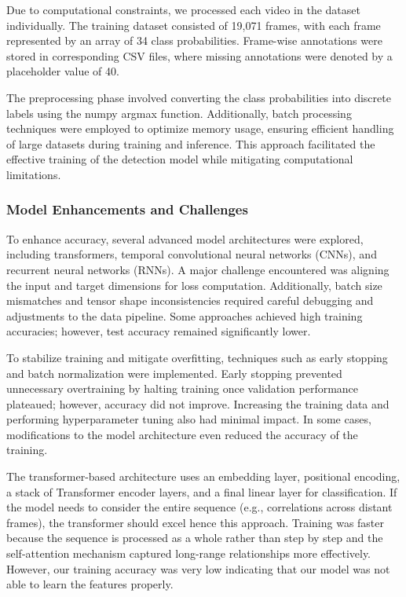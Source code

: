 \documentclass{article}
\begin{document}
Due to computational constraints, we processed each video in the dataset individually. The training dataset consisted of 19,071 frames, with each frame represented by an array of 34 class probabilities. Frame-wise annotations were stored in corresponding CSV files, where missing annotations were denoted by a placeholder value of 40.

The preprocessing phase involved converting the class probabilities into discrete labels using the numpy argmax function. Additionally, batch processing techniques were employed to optimize memory usage, ensuring efficient handling of large datasets during training and inference. This approach facilitated the effective training of the detection model while mitigating computational limitations.
\subsubsection{Model Enhancements and Challenges}
To enhance accuracy, several advanced model architectures were explored, including transformers, temporal convolutional neural networks (CNNs), and recurrent neural networks (RNNs). A major challenge encountered was aligning the input and target dimensions for loss computation. Additionally, batch size mismatches and tensor shape inconsistencies required careful debugging and adjustments to the data pipeline. Some approaches achieved high training accuracies; however, test accuracy remained significantly lower.

To stabilize training and mitigate overfitting, techniques such as early stopping and batch normalization were implemented. Early stopping prevented unnecessary overtraining by halting training once validation performance plateaued; however, accuracy did not improve. Increasing the training data and performing hyperparameter tuning also had minimal impact. In some cases, modifications to the model architecture even reduced the accuracy of the training.

The transformer-based architecture uses an embedding layer, positional encoding, a stack of Transformer encoder layers, and a final linear layer for classification. If the model needs to consider the entire sequence (e.g., correlations across distant frames), the transformer should excel hence this approach. Training was faster because the sequence is processed as a whole rather than step by step and the self-attention mechanism captured long-range relationships more effectively. However, our training accuracy was very low indicating that our model was not able to learn the features properly.
\end{document}
